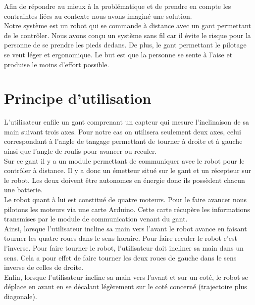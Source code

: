 Afin de répondre au mieux à la problématique et de prendre en compte les contraintes liées au contexte nous avons imaginé une solution. \\

Notre système est un robot qui se commande à distance avec un gant permettant de le contrôler.
Nous avons conçu un système sans fil car il évite le risque pour la personne de se prendre les pieds dedans. De plus, le gant permettant le pilotage se veut léger et ergonomique. Le but est que la personne se sente à l'aise et produise le moins d'effort possible. \\




\section{Principe d'utilisation}

L'utilisateur enfile un gant comprenant un capteur qui mesure l'inclinaison de sa main suivant trois axes. Pour notre cas on utilisera seulement deux axes, celui correspondant à l'angle de tangage permettant de tourner à droite et à gauche ainsi que l'angle de roulis pour avancer ou reculer. \\

Sur ce gant il y a un module permettant de communiquer avec le robot pour le contrôler à distance.
Il y a donc un émetteur situé sur le gant et un récepteur sur le robot.
Les deux doivent être autonomes en énergie donc ils possèdent chacun une batterie. \\

Le robot quant à lui est constitué de quatre moteurs. Pour le faire avancer nous pilotons les moteurs via une carte Arduino. Cette carte récupère les informations transmises par le module de communication venant du gant. \\

Ainsi, lorsque l'utilisateur incline sa main vers l'avant le robot avance en faisant tourner les quatre roues dans le sens horaire. Pour faire reculer le robot c'est l'inverse.
Pour faire tourner le robot, l'utilisateur doit incliner sa main dans un sens. Cela a pour effet de faire tourner les deux roues de gauche dans le sens inverse de celles de droite. \\

Enfin, lorsque l'utilisateur incline sa main vers l'avant et sur un coté, le robot se déplace en avant en se décalant légèrement sur le coté concerné (trajectoire plus diagonale).

